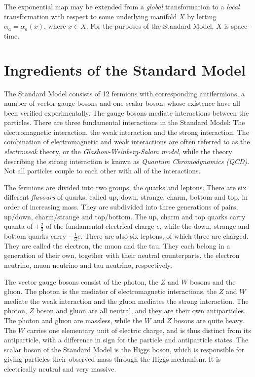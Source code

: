 \documentclass[twoside,english]{uiofysmaster}
\begin{document}
The exponential map may be extended from a {\it global} transformation to a {\it local} transformation with respect to some underlying manifold $X$ by letting $\alpha_a = \alpha_a(x)$, where $x\in X$. For the purposes of the Standard Model, $X$ is space-time.




\section{Ingredients of the Standard Model}

The Standard Model consists of 12 fermions with corresponding antifermions, a number of vector gauge bosons and one scalar boson, whose existence have all been verified experimentally. The gauge bosons mediate interactions between the particles. There are three fundamental interactions in the Standard Model: The electromagnetic interaction, the weak interaction and the strong interaction. The combination of electromagnetic and weak interactions are often referred to as the {\it electroweak} theory, or the {\it Glashow-Weinberg-Salam model}, while the theory describing the strong interaction is known as {\it Quantum Chromodynamics (QCD)}. Not all particles couple to each other with all of the interactions. 

The fermions are divided into two groups, the quarks and leptons. There are six different {\it flavours} of quarks, called up, down, strange, charm, bottom and top, in order of increasing mass. They are subdivided into three generations of pairs, up/down, charm/strange and top/bottom. The up, charm and top quarks carry quanta of $+\frac{2}{3}$ of the fundamental electrical charge $e$, while the down, strange and bottom quarks carry $-\frac{1}{3}e$. There are also six leptons, of which three are charged. They are called the electron, the muon and the tau. They each belong in a generation of their own, together with their neutral counterparts, the electron neutrino, muon neutrino and tau neutrino, respectively. 

The vector gauge bosons consist of the photon, the $Z$ and $W$ bosons and the gluon. The photon is the mediator of electromagnetic interactions, the $Z$ and $W$ mediate the weak interaction and the gluon mediates the strong interaction. The photon, $Z$ boson and gluon are all neutral, and they are their own antiparticles. The photon and gluon are massless, while the $W$ and $Z$ bosons are quite heavy. The $W$ carries one elementary unit of electric charge, and is thus distinct from its antiparticle, with a difference in sign for the particle and antiparticle states. The scalar boson of the Standard Model is the Higgs boson, which is responsible for giving particles their observed mass through the Higgs mechanism. It is electrically neutral and very massive.
\end{document}

